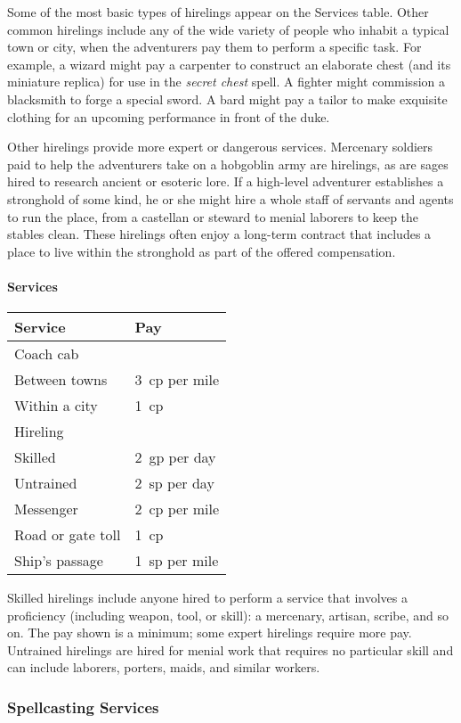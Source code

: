 \documentclass[
]{article}
\begin{document}
Some of the most basic types of hirelings appear on the Services table.
Other common hirelings include any of the wide variety of people who
inhabit a typical town or city, when the adventurers pay them to perform
a specific task. For example, a wizard might pay a carpenter to
construct an elaborate chest (and its miniature replica) for use in the
\emph{secret chest} spell. A fighter might commission a blacksmith to
forge a special sword. A bard might pay a tailor to make exquisite
clothing for an upcoming performance in front of the duke.

Other hirelings provide more expert or dangerous services. Mercenary
soldiers paid to help the adventurers take on a hobgoblin army are
hirelings, as are sages hired to research ancient or esoteric lore. If a
high-level adventurer establishes a stronghold of some kind, he or she
might hire a whole staff of servants and agents to run the place, from a
castellan or steward to menial laborers to keep the stables clean. These
hirelings often enjoy a long-term contract that includes a place to live
within the stronghold as part of the offered compensation.

\hypertarget{services-1}{%
\paragraph{Services}\label{services-1}}

\begin{longtable}[]{@{}ll@{}}
\toprule
Service & Pay\tabularnewline
\midrule
\endhead
Coach cab &\tabularnewline
Between towns & 3~cp per mile\tabularnewline
Within a city & 1~cp\tabularnewline
Hireling &\tabularnewline
Skilled & 2~gp per day\tabularnewline
Untrained & 2~sp per day\tabularnewline
Messenger & 2~cp per mile\tabularnewline
Road or gate toll & 1~cp\tabularnewline
Ship's passage & 1~sp per mile\tabularnewline
\bottomrule
\end{longtable}

Skilled hirelings include anyone hired to perform a service that
involves a proficiency (including weapon, tool, or skill): a mercenary,
artisan, scribe, and so on. The pay shown is a minimum; some expert
hirelings require more pay. Untrained hirelings are hired for menial
work that requires no particular skill and can include laborers,
porters, maids, and similar workers.

\hypertarget{spellcasting-services}{%
\subsubsection{Spellcasting Services}\label{spellcasting-services}}
\end{document}
